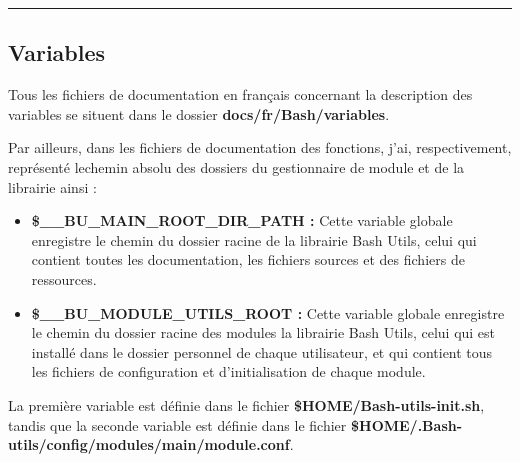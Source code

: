 \documentclass[a4paper,10pt]{article}
\begin{document}


\color{green}\par\noindent\rule{\textwidth}{0.4pt}\color{white}

\color{green}
\subsection{Variables}\color{white}

\begin{justify}
    Tous les fichiers de documentation en français concernant la description des variables se situent dans le dossier \textbf{\color{lime}docs/fr/Bash/variables}.
\end{justify}


\begin{justify}
    Par ailleurs, dans les fichiers de documentation des fonctions, j'ai, respectivement, représenté le\linebreak chemin absolu des dossiers du gestionnaire de module et de la librairie ainsi :

    \begin{itemize}
        \item \textbf{\color{orange}\$\_\_BU\_MAIN\_ROOT\_DIR\_PATH\color{white} :} Cette variable globale enregistre le chemin du dossier racine de la librairie Bash Utils, celui qui contient toutes les documentation, les fichiers sources et des fichiers de ressources.\\

        \item \textbf{\color{orange}\$\_\_BU\_MODULE\_UTILS\_ROOT\color{white} :} Cette variable globale enregistre le chemin du dossier racine des modules la librairie Bash Utils, celui qui est installé dans le dossier personnel de chaque utilisateur, et qui contient tous les fichiers de configuration et d'initialisation de chaque module.
    \end{itemize}
\end{justify}



\begin{justify}
    La première variable est définie dans le fichier \textbf{\color{lime}\$HOME/Bash-utils-init.sh}, tandis que la seconde variable est définie dans le fichier \textbf{\color{lime}\$HOME/.Bash-utils/config/modules/main/module.conf}.
\end{justify}
\end{document}
